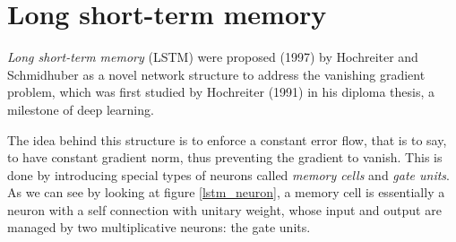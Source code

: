\section{Long short-term memory} 

\textit{Long short-term memory} (LSTM) were proposed (1997) by Hochreiter and Schmidhuber\cite{lstm} as a novel network 
structure to address the vanishing gradient problem, which was first studied by Hochreiter (1991) in his diploma 
thesis, a milestone of deep learning.

The idea behind this structure is to enforce a constant error flow, that is to say, to have constant gradient norm, 
thus preventing the gradient to vanish. This is done by introducing special types of neurons called \textit{memory 
cells} and \textit{gate units}. As we can see by looking at figure \ref{lstm_neuron}, a memory cell is essentially a 
neuron with a self connection with unitary weight, whose input and output are managed by two multiplicative neurons: 
the gate units.


